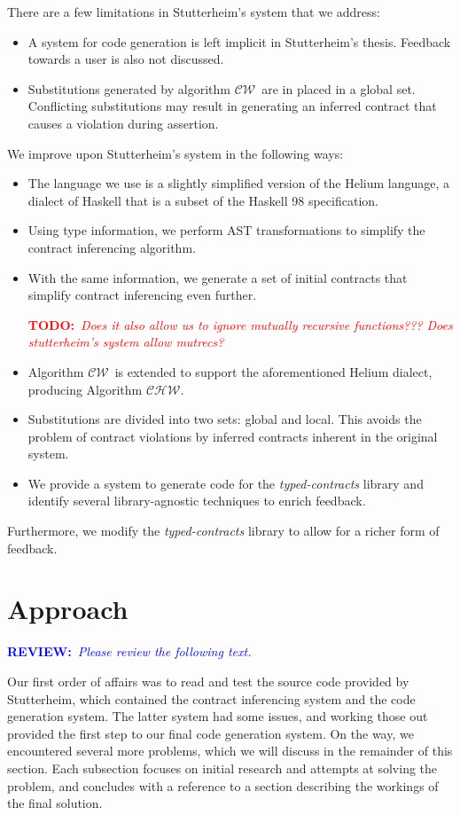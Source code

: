 \documentclass[10pt]{report}
\newcommand{\CW}{$\mathcal{CW}$}
\newcommand{\CHW}{$\mathcal{CHW}$}
\newcommand{\annotate}[3]{
	\begin{scriptsize}
	\textcolor{#1}{\textbf{#2}~\textit{#3}}
	\end{scriptsize}\newline}
\newcommand{\todo}[1]{\annotate{red} {TODO:} {#1}}
\newcommand{\review}{\annotate{blue} {REVIEW:} {Please review the following text. \newline}}
\begin{document}
There are a few limitations in Stutterheim's system that we address:

\begin{itemize}
	\item A system for code generation is left implicit in Stutterheim's thesis. Feedback towards a user is also not discussed.
	\item Substitutions generated by algorithm \CW ~are in placed in a global set. Conflicting substitutions may result in generating an inferred contract that causes a violation during assertion.
\end{itemize}

We improve upon Stutterheim's system in the following ways:
\begin{itemize}
	\item The language we use is a slightly simplified version of the Helium language, a dialect of Haskell that is a subset of the Haskell 98 specification.
	\item Using type information, we perform AST transformations to simplify the contract inferencing algorithm.
	\item With the same information, we generate a set of initial contracts that simplify contract inferencing even further. \todo{Does it also allow us to ignore mutually recursive functions??? Does stutterheim's system allow mutrecs?}
	\item Algorithm \CW ~is extended to support the aforementioned Helium dialect, producing Algorithm \CHW.
	\item Substitutions are divided into two sets: global and local. This avoids the problem of contract violations by inferred contracts inherent in the original system.
	\item We provide a system to generate code for the \textit{typed-contracts} library and identify several library-agnostic techniques to enrich feedback.
\end{itemize}

Furthermore, we modify the \textit{typed-contracts} library to allow for a richer form of feedback.



\chapter{Approach}

\review

Our first order of affairs was to read and test the source code provided by Stutterheim, which contained the contract inferencing system and the code generation system.
The latter system had some issues, and working those out provided the first step to our final code generation system.
On the way, we encountered several more problems, which we will discuss in the remainder of this section.
Each subsection focuses on initial research and attempts at solving the problem, and concludes with a reference to a section describing the workings of the final solution.
\end{document}
